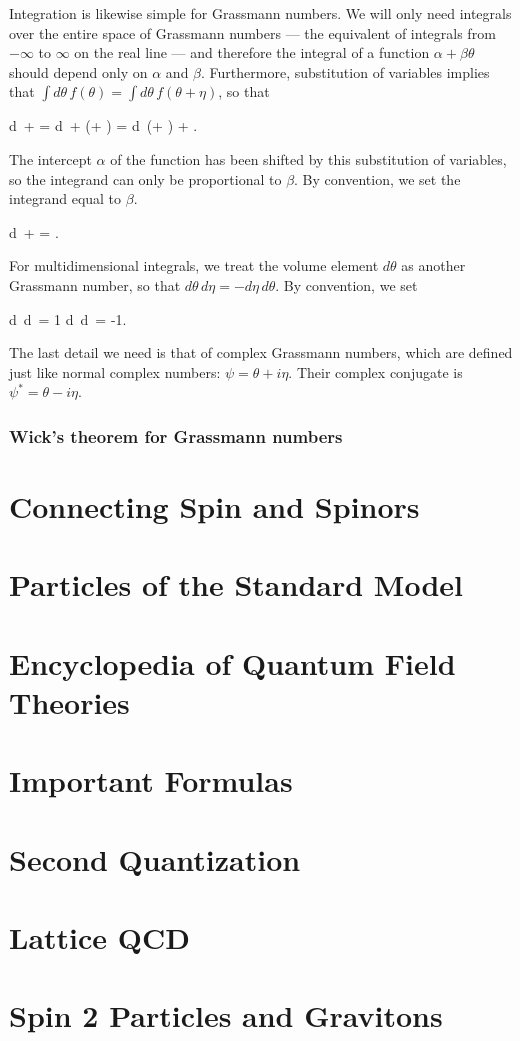 Integration is likewise simple for Grassmann numbers. We will only need integrals over the entire space of Grassmann numbers --- the equivalent of integrals from $-\infty$ to $\infty$ on the real line --- and therefore the integral of a function $\alpha + \beta \theta$ should depend only on $\alpha$ and $\beta$. Furthermore, substitution of variables implies that $\int d\theta\, f(\theta) = \int d\theta\, f(\theta + \eta)$, so that
\begin{e}
  \int d\theta\, \alpha +  \beta\theta = \int d\theta\, \alpha +  \beta(\theta + \eta) = \int d\theta\, (\alpha + \beta \eta) + \beta \theta.
\end{e}
The intercept $\alpha$ of the function has been shifted by this substitution of variables, so the integrand can only be proportional to $\beta$. By convention, we set the integrand equal to $\beta$.
\begin{e}
  \int d\theta\, \alpha +  \beta\theta = \beta.
\end{e}
For multidimensional integrals, we treat the volume element $d\theta$ as another Grassmann number, so that $d\theta\,d\eta = -d\eta \, d\theta$. By convention, we set
\begin{e}
  \int d\eta\, d\theta\, \theta \eta = 1 \implies \int d\theta\, d\eta\, \theta \eta = -1.
\end{e}

The last detail we need is that of complex Grassmann numbers, which are defined just like normal complex numbers: $\psi = \theta + i\eta$. Their complex conjugate is $\psi^* = \theta - i\eta$.

\subsection{Wick's theorem for Grassmann numbers}

\chapter{Connecting Spin and Spinors}
\label{app:spin-spinors}


\chapter{Particles of the Standard Model}
\chapter{Encyclopedia of Quantum Field Theories}
\chapter{Important Formulas}
\chapter{Second Quantization}
\chapter{Lattice QCD}
\chapter{Spin 2 Particles and Gravitons}
\label{app:noether}